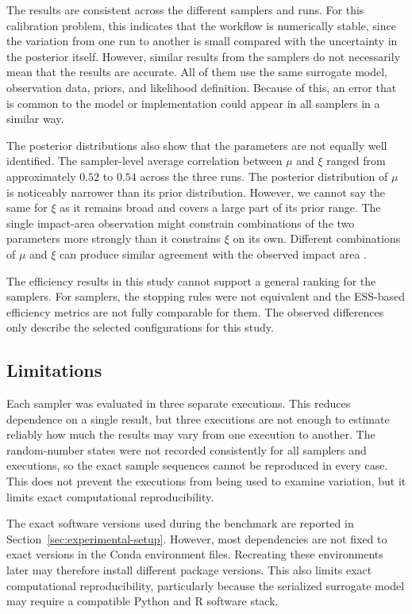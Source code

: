 The results are consistent across the different samplers and runs. For this calibration problem, this indicates that the workflow is numerically stable, since the variation from one run to another is small compared with the uncertainty in the posterior itself. However, similar results from the samplers do not necessarily mean that the results are accurate. All of them use the same surrogate model, observation data, priors, and likelihood definition. Because of this, an error that is common to the model or implementation could appear in all samplers in a similar way.

The posterior distributions also show that the parameters are not equally well identified. The sampler-level average correlation between $\mu$ and $\xi$ ranged from approximately $0.52$ to $0.54$ across the three runs. The posterior distribution of $\mu$ is noticeably narrower than its prior distribution. However, we cannot say the same for $\xi$ as it remains broad and covers a large part of its prior range. The single impact-area observation might constrain combinations of the two parameters more strongly than it constrains $\xi$ on its own. Different combinations of $\mu$ and $\xi$ can produce similar agreement with the observed impact area \autocite{Arendt2012}.

The efficiency results in this study cannot support a general ranking for the samplers. For samplers, the stopping rules were not equivalent and the ESS-based efficiency metrics are not fully comparable for them. The observed differences only describe the selected configurations for this study.

\subsection{Limitations}
\label{sec:evaluation-limitations}

Each sampler was evaluated in three separate executions. This reduces dependence on a single result, but three executions are not enough to estimate reliably how much the results may vary from one execution to another. The random-number states were not recorded consistently for all samplers and executions, so the exact sample sequences cannot be reproduced in every case. This does not prevent the executions from being used to examine variation, but it limits exact computational reproducibility.

The exact software versions used during the benchmark are reported in Section~\ref{sec:experimental-setup}. However, most dependencies are not fixed to exact versions in the Conda environment files. Recreating these environments later may therefore install different package versions. This also limits exact computational reproducibility, particularly because the serialized surrogate model may require a compatible Python and R software stack.

